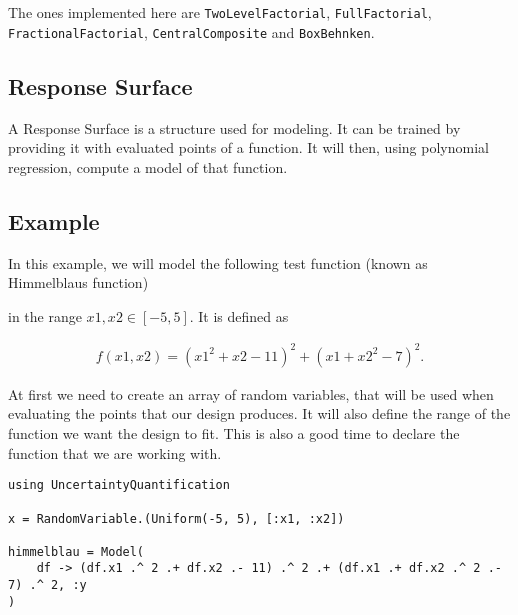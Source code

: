 The ones implemented here are \texttt{TwoLevelFactorial}, \texttt{FullFactorial}, \texttt{FractionalFactorial}, \texttt{CentralComposite} and \texttt{BoxBehnken}.



\subsection{Response Surface}



\label{11236368157692582757}{}


A Response Surface is a structure used for modeling.     It can be trained by providing it with evaluated points of a function.     It will then, using polynomial regression, compute a model of that function.



\subsection{Example}



\label{12204569949998619624}{}


In this example, we will model the following test function (known as Himmelblau{\textquotesingle}s function)



in the range \(x1, x2 ∈ [-5, 5]\). It is defined as



\begin{equation*}
\begin{split}f(x1, x2) = (x1^2 + x2 - 11)^2 + (x1 + x2^2 - 7)^2.\end{split}\end{equation*}




\begin{figure}
\centering
\caption{}
\end{figure}
 At first we need to create an array of random variables, that will be used when evaluating the points that our design produces. It will also define the range of the function we want the design to fit. This is also a good time to declare the function that we are working with.




\begin{verbatim}
using UncertaintyQuantification

x = RandomVariable.(Uniform(-5, 5), [:x1, :x2])

himmelblau = Model(
    df -> (df.x1 .^ 2 .+ df.x2 .- 11) .^ 2 .+ (df.x1 .+ df.x2 .^ 2 .- 7) .^ 2, :y
)
\end{verbatim}


